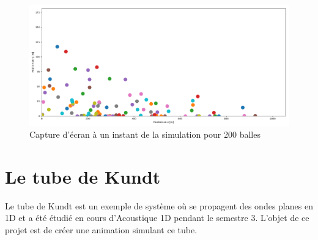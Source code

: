 \documentclass[a4paper,11pt]{article}
\begin{document}
\begin{figure}[H]
	\centering
	\includegraphics[width=\linewidth]{Figures/multiball.png}
	\caption{Capture d'écran à un instant de la simulation pour 200 balles}
	\label{fig:multiball} 
\end{figure}








\newpage
\section{Le tube de Kundt}

Le tube de Kundt est un exemple de système où se propagent des ondes planes en 1D et a été étudié en cours d'Acoustique 1D pendant le semestre 3. L'objet de ce projet est de créer une animation simulant ce tube. 
\end{document}
